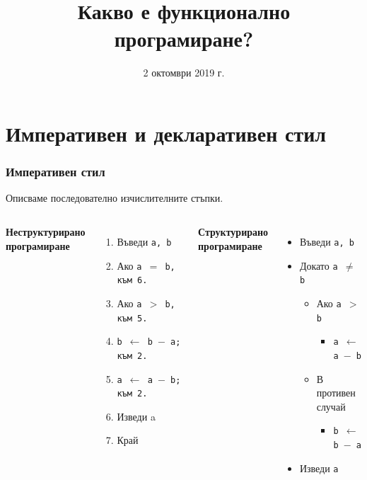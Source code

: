\documentclass[alsotrans]{beamerswitch}
\title[Какво е ФП?]{Какво е функционално програмиране?}
\date{2 октомври 2019 г.}
\begin{document}
\begin{frame}
  \titlepage
\end{frame}

\section*{Императивен и декларативен стил}

\begin{frame}
  \frametitle{Императивен стил}

  Описваме последователно изчислителните стъпки.\\[1em]
  \begin{columns}[t,onlytextwidth]

    \textbf{Неструктурирано\\програмиране}\\[1em]
    \begin{enumerate}
    \item Въведи \tt a, \tt b
    \item Ако \tt{a $=$ b}, към 6.
    \item Ако \tt{a $>$ b}, към 5.
    \item \tt{b $\leftarrow$ b $-$ a}; към 2.
    \item \tt{a $\leftarrow$ a $-$ b}; към 2.
    \item Изведи a
    \item Край
    \end{enumerate}

    \textbf{Структурирано\\програмиране}\\[1em]
    \begin{itemize}
    \item Въведи \tt a, \tt b
    \item Докато \tt{a $\neq$ b}
      \begin{itemize}
      \item Ако \tt{a $>$ b}
        \begin{itemize}
        \item \tt{a $\leftarrow$ a $-$ b}
        \end{itemize}
      \item В противен случай
        \begin{itemize}
        \item \tt{b $\leftarrow$ b $-$ a}
        \end{itemize}
      \end{itemize}
    \item Изведи \tt a
    \end{itemize}

  \end{columns}
\end{frame}
\end{document}
